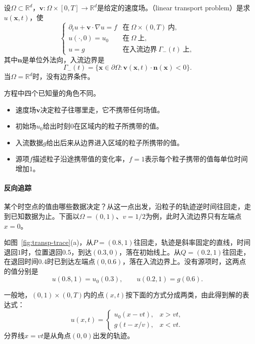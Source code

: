 \begin{definition}[线性输运问题]
\label{def:transp-problem}
设$\Omega\subset\mathbb{R}^{d}$，$\bm{v}:\Omega\times[0,T]\to\mathbb{R}^{d}$是给定的速度场。（linear transport problem）是求$u(\bm{x},t)$，使
\begin{equation}
  \begin{cases}
    \partial_tu+\bm{v}\cdot\nabla u=f & \text{在}\ \Omega\times(0,T)\ \text{内},\\
    u(\cdot,0)=u_0 & \text{在}\ \Omega\ \text{上},\\
    u=g & \text{在入流边界}\ \Gamma_{-}(t)\ \text{上},
  \end{cases}
  \label{eq:transp-ibvp}
\end{equation}
其中$\bm{n}$是单位外法向，入流边界是
\begin{equation}
  \Gamma_{-}(t)=\{\bm{x}\in\partial\Omega:\bm{v}(\bm{x},t)\cdot\bm{n}(\bm{x})<0\}.
  \label{eq:transp-inflow-boundary}
\end{equation}
当$\Omega=\mathbb{R}^{d}$时，没有边界条件。
\end{definition}

方程中四个已知量的角色不同。
\begin{itemize}
  \item 速度场$\bm{v}$决定粒子往哪里走，它不携带任何场值。
  \item 初始场$u_0$给出时刻$0$在区域内的粒子所携带的值。
  \item 入流数据$g$给出后来从边界进入区域的粒子所携带的值。
  \item 源项$f$描述粒子沿途携带值的变化率，$f=1$表示每个粒子携带的值每单位时间增加$1$。
\end{itemize}

\paragraph{反向追踪}
某个时空点的值由哪些数据决定？从这一点出发，沿粒子的轨迹逆时间往回走，走到已知数据为止。下面以$\Omega=(0,1)$、$v=1/2$为例，此时入流边界只有左端点$x=0$。

如图~\ref{fig:transp-trace}(a)，从$P=(0.8,1)$往回走，轨迹是斜率固定的直线，时间退回$1$时，位置退回$0.5$，到达$(0.3,0)$，落在初始线上。从$Q=(0.2,1)$往回走，在退回时间$0.4$时已到达左端点$(0,0.6)$，落在入流边界上。没有源项时，这两点的值分别是
\[
  u(0.8,1)=u_0(0.3),\qquad u(0.2,1)=g(0.6).
\]

一般地，$(0,1)\times(0,T)$内的点$(x,t)$按下面的方式分成两类，由此得到解的表达式：
\begin{equation}
  u(x,t)=
  \begin{cases}
    u_0(x-vt), & x>vt,\\
    g(t-x/v), & x<vt.
  \end{cases}
  \label{eq:transp-inflow-solution}
\end{equation}
分界线$x=vt$是从角点$(0,0)$出发的轨迹。

